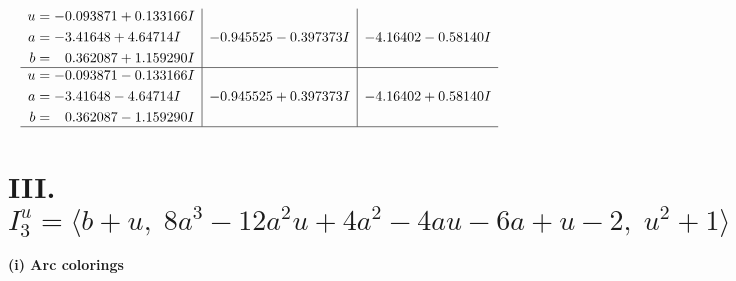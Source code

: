 \documentclass[1p]{elsarticle_modified}
\theoremstyle{definition}
\begin{document}
$$\begin{array}{c|c|c}
\begin{aligned}
u &= -0.093871 + 0.133166 I \\
a &= -3.41648 + 4.64714 I \\
b &= \phantom{-}0.362087 + 1.159290 I\end{aligned}
 & -0.945525 - 0.397373 I & -4.16402 - 0.58140 I \\ \hline\begin{aligned}
u &= -0.093871 - 0.133166 I \\
a &= -3.41648 - 4.64714 I \\
b &= \phantom{-}0.362087 - 1.159290 I\end{aligned}
 & -0.945525 + 0.397373 I & -4.16402 + 0.58140 I\\
 \hline 
 \end{array}$$\newpage\newpage\renewcommand{\arraystretch}{1}
\centering \section*{III. $I^u_{3}= \langle b+u,\;8 a^3-12 a^2 u+4 a^2-4 a u-6 a+u-2,\;u^2+1 \rangle$}
\flushleft \textbf{(i) Arc colorings}\\
\end{document}
